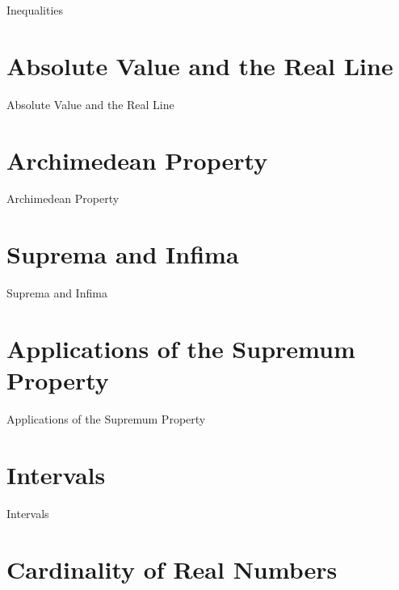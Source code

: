 Inequalities

\section{Absolute Value and the Real Line}
\label{sec:absolute-value-and-the-real-line}

Absolute Value and the Real Line

\section{Archimedean Property}
\label{sec:archimedean-property}

Archimedean Property

\section{Suprema and Infima}
\label{sec:suprema-and-infima}

Suprema and Infima

\section{Applications of the Supremum Property}
\label{sec:applications-of-the-supremum-property}

Applications of the Supremum Property

\section{Intervals}
\label{sec:intervals}

Intervals

\section{Cardinality of Real Numbers}
\label{sec:cardinality-of-real-numbers}

